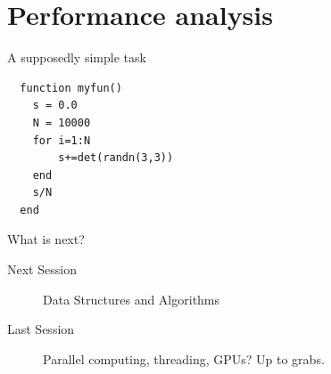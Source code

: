 \documentclass{beamer}
\begin{document}
\section{Performance analysis}
\begin{frame}[fragile]{A supposedly simple task}
  \begin{lstlisting}
  function myfun()
    s = 0.0
    N = 10000
    for i=1:N
        s+=det(randn(3,3))
    end
    s/N
  end
  \end{lstlisting}
\end{frame}

\begin{frame}{What is next?}
  \begin{description}
    \item[Next Session] Data Structures and Algorithms
    \item[Last Session] Parallel computing, threading, GPUs? Up to grabs.
  \end{description}
\end{frame}
\end{document}

